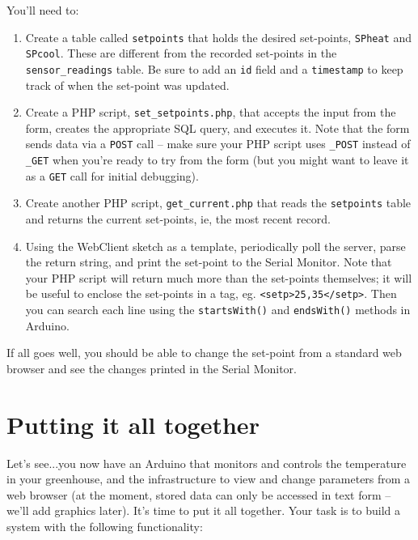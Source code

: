 \documentclass[11pt]{article} %
\begin{document}
You'll need to:
\begin{enumerate}
\item Create a table called \verb|setpoints| that holds the desired set-points, \verb|SPheat| and \verb|SPcool|. These are different from the recorded set-points in the \verb|sensor_readings| table. Be sure to add an \verb|id| field and a \verb|timestamp| to keep track of when the set-point was updated.
\item Create a PHP script, \verb|set_setpoints.php|, that accepts the input from the form, creates the appropriate SQL query, and executes it. Note that the form sends data via a \verb|POST| call -- make sure your PHP script uses \verb|_POST| instead of \verb|_GET| when you’re ready to try from the form (but you might want to leave it as a \verb|GET| call for initial debugging).
\item Create another PHP script, \verb|get_current.php| that reads the \verb|setpoints| table and returns the current set-points, ie, the most recent record.%
\item Using the WebClient sketch as a template, periodically poll the server, parse the return string, and print the set-point to the Serial Monitor. Note that your PHP script will return much more than the set-points themselves; it will be useful to enclose the set-points in a tag, eg. \verb|<setp>25,35</setp>|. Then you can search each line using the \verb|startsWith()| and \verb|endsWith()| methods in Arduino.
\end{enumerate}

If all goes well, you should be able to change the set-point from a standard web browser and see the changes printed in the Serial Monitor.

\section*{Putting it all together}

Let's see...you now have an Arduino that monitors and controls the temperature in your greenhouse, and the infrastructure to view and change parameters from a web browser (at the moment, stored data can only be accessed in text form -- we'll add graphics later). It's time to put it all together. Your task is to build a system with the following functionality:
\end{document}
